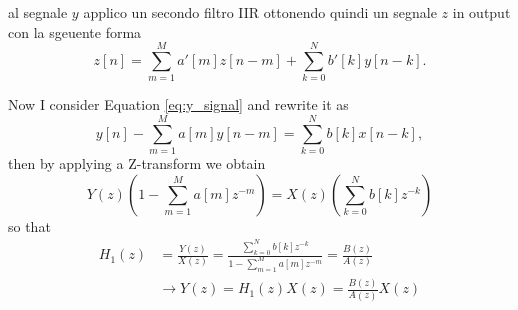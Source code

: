 al segnale $y$ applico un secondo filtro IIR ottonendo quindi un segnale $z$ in output con la sgeuente forma 
\begin{equation}\label{eq:z_signal}
    z[n] = \sum_{m=1}^{M} a'[m]z[n-m] + \sum_{k=0}^{N} b'[k] y[n-k].
\end{equation}

Now I consider Equation \ref{eq:y_signal} and rewrite it as
\begin{equation}\label{eq:y_signal1}
    y[n] - \sum_{m=1}^{M} a[m]y[n-m] = \sum_{k=0}^{N} b[k] x[n-k],
\end{equation} 
then by applying a Z-transform we obtain
\begin{equation}\label{eq:y_signal_transform}
    Y(z)\left(1 - \sum_{m=1}^{M} a[m] z^{-m} \right) = X(z) \left( \sum_{k=0}^{N} b[k] z^{-k} \right)
\end{equation}
so that 
\begin{align}
    H_1(z) &= \frac{Y(z)}{X(z)} = \frac{\sum_{k=0}^{N} b[k] z^{-k}}{1 - \sum_{m=1}^{M} a[m] z^{-m}} = \frac{B(z)}{A(z)} \\
    & \rightarrow Y(z) = H_1(z)X(z) = \frac{B(z)}{A(z)}X(z) \\ \label{eq:transfer1}
\end{align}


